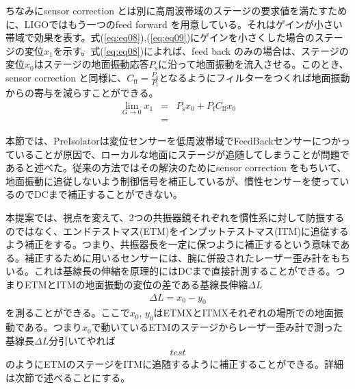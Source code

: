 \documentclass[a4paper,12pt]{jsarticle}
\begin{document}
ちなみにsensor correction とは別に高周波帯域のステージの要求値を満たすために、LIGOではもう一つのfeed forward を用意している。それはゲインが小さい帯域で効果を表す。式(\ref{eq:eq08}),(\ref{eq:eq09})にゲインを小さくした場合のステージの変位$x_1$を示す。式(\ref{eq:eq08})によれば、feed back のみの場合は、ステージの変位$x_0$はステージの地面振動応答$P_{\mathrm{s}}$に沿って地面振動を流入させる。このとき、sensor correction と同様に、$C_{\mathrm{ff}}=\frac{P_{\mathrm{s}}}{P_{\mathrm{f}}}$となるようにフィルターをつくれば地面振動からの寄与を減らすことができる。
\begin{eqnarray}\label{eq:eq08}
  \lim_{G \to 0} x_{1} &=& P_{\mathrm{s}}x_0 + P_{\mathrm{f}}C_{\mathrm{ff}}x_0 \\
  &=& 
\end{eqnarray}


本節では、PreIsolatorは変位センサーを低周波帯域でFeedBackセンサーにつかっていることが原因で、ローカルな地面にステージが追随してしまうことが問題であると述べた。従来の方法ではその解決のためにsensor correction をもちいて、地面振動に追従しないよう制御信号を補正しているが、慣性センサーを使っているのでDCまで補正することができない。

本提案では、視点を変えて、2つの共振器鏡それぞれを慣性系に対して防振するのではなく、エンドテストマス(ETM)をインプットテストマス(ITM)に追従するよう補正をする。つまり、共振器長を一定に保つように補正するという意味である。補正するために用いるセンサーには、腕に併設されたレーザー歪み計をもちいる。これは基線長の伸縮を原理的にはDCまで直接計測することができる。つまりETMとITMの地面振動の変位の差である基線長伸縮$\Delta{L}$
\begin{eqnarray}
  \Delta{L} = x_0-y_0
\end{eqnarray}
を測ることができる。ここで$x_0,\,y_0$はETMXとITMXそれぞれの場所での地面振動である。つまり$x_0$で動いているETMのステージからレーザー歪み計で測った基線長$\Delta{L}$分引いてやれば
\begin{eqnarray}
  test
\end{eqnarray}
のようにETMのステージをITMに追随するように補正することができる。詳細は次節で述べることにする。
\end{document}
